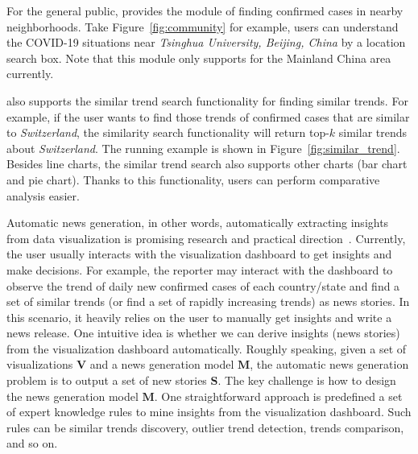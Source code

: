 For the general public, \sys provides the module of finding confirmed cases in nearby neighborhoods. 
Take Figure~\ref{fig:community} for example, users can understand the COVID-19 situations near {\em Tsinghua University, Beijing, China} by a location search box. Note that this module only supports for the Mainland China area currently.

\sys also supports the similar trend search functionality for finding similar trends. 
For example, if the user wants to find those trends of confirmed cases that are similar to {\em Switzerland}, the similarity search functionality will return top-$k$ similar trends about {\em Switzerland}.
The running example is shown in Figure~\ref{fig:similar_trend}. 
Besides line charts,  the similar trend search also supports other charts (\eg bar chart and pie chart).
Thanks to this functionality,  users can perform comparative analysis easier.

Automatic news generation, in other words, automatically extracting insights from data visualization is promising research and practical direction~\cite{DBLP:journals/vldb/QinLTL20}.
Currently, the user usually interacts with the visualization dashboard to get insights and make decisions. 
For example, the reporter may interact with the dashboard to observe the trend of daily new confirmed cases of each country/state and find a set of similar trends (or find a set of rapidly increasing trends) as news stories.
In this scenario, it heavily relies on the user to manually get insights and write a news release.
One intuitive idea is whether we can derive insights (news stories) from the visualization dashboard automatically. 
%
Roughly speaking, given a set of visualizations $\mathbf{V}$ and a news generation model $\mathbf{M}$, the automatic news generation problem is to output a set of new stories $\mathbf{S}$. 
The key challenge is how to design the news generation model $\mathbf{M}$.
One straightforward approach is predefined a set of expert knowledge rules to mine insights from the visualization dashboard.
%
Such rules can be similar trends discovery, outlier trend detection, trends comparison, and so on.





